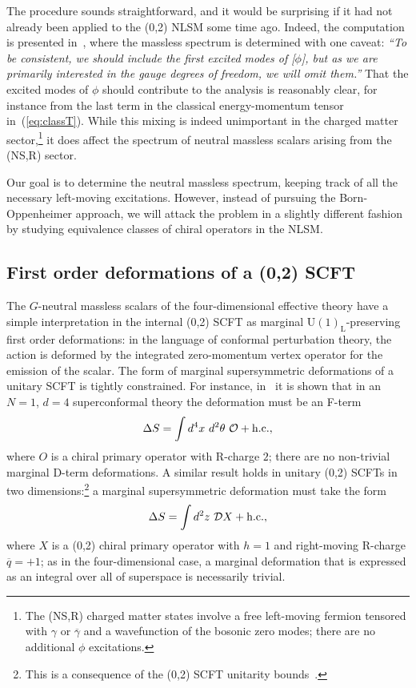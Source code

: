 \documentclass[11pt, a4paper]{article}
\def\GUL{\GU(1)_{\text{L}}}
\def\GU{\operatorname{U{}}}
\def\cD{{\cal D}}
\def\cO{{\cal O}}
\newcommand\gammab{\overline{\gamma}}
\newcommand\qb{\overline{q}}
\begin{document}
The procedure sounds straightforward, and it would be surprising if it had
not already been applied to the (0,2) NLSM some time ago.  Indeed, the
computation is presented in~\cite{Distler:1987ee}, where
the massless spectrum is determined with one caveat:  \emph{``To be consistent,
we should include the first excited modes of [$\phi$], but as we are 
primarily interested in the gauge degrees of freedom, we will omit them.''}
That the excited modes of $\phi$ should contribute to the analysis is
reasonably clear, for instance from the last term in the classical energy-momentum
tensor in~(\ref{eq:classT}).  While this mixing
is indeed unimportant in the charged matter sector,\footnote{The (NS,R) charged matter states
involve a free left-moving fermion tensored with $\gamma$ or $\gammab$ and a wavefunction
of the bosonic zero modes;  there are no additional $\phi$ excitations.} it does 
affect the spectrum of neutral massless scalars arising from the (NS,R)
sector.

Our goal is to determine the neutral massless spectrum, keeping
track of all the necessary left-moving excitations.  However, instead of pursuing
the Born-Oppenheimer approach, we will attack the problem in a slightly different
fashion by studying equivalence classes of chiral operators in the NLSM.

\subsection{First order deformations of a (0,2) SCFT}
The $G$-neutral massless scalars of the four-dimensional effective theory have
a simple interpretation in the internal (0,2) SCFT as marginal $\GUL$-preserving 
first order deformations:  in the language of conformal perturbation theory, the
action is deformed by the integrated zero-momentum vertex operator for the
emission of the scalar.  The form of marginal supersymmetric deformations of
a unitary SCFT is tightly constrained.  For instance, in~\cite{Green:2010da} 
it is shown that in an $N=1$, $d=4$ superconformal theory the deformation must
be an F-term 
$$\Delta S = \int d^4 x ~d^2 \theta~ \cO + \text{h.c.},$$
where $O$ is a chiral primary operator with R-charge $2$;  there are
no non-trivial marginal D-term deformations.  A similar result holds in unitary (0,2)
SCFTs in two 
dimensions:\footnote{This is a consequence of  the (0,2) SCFT unitarity bounds~\cite{unpub:2dcft}.} 
a marginal supersymmetric deformation must take the form
\begin{align*}
\Delta S = \int d^2 z ~\cD X + \text{h.c.},
\end{align*}
where $X$ is a (0,2) chiral primary operator with $h=1$ and 
right-moving R-charge $\qb =+1$; as in the four-dimensional case,
a marginal deformation that is expressed as an integral over all of superspace
is necessarily trivial.
\end{document}
